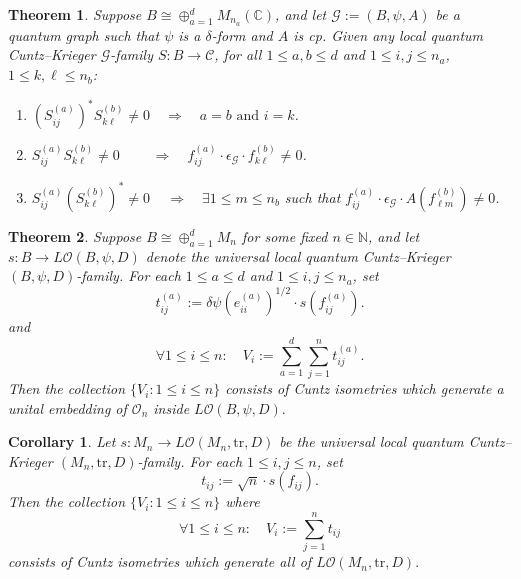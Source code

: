 \documentclass[10pt,a4paper]{amsart}
\newtheorem{theorem}{Theorem}
\newtheorem{corollary}{Corollary}
\newcommand\bC{{\mathbb C}}
\newcommand\cG{{\mathcal G}}
\newcommand\cO{{\mathcal O}}
\newcommand{\tr}{\text{tr}} %
\begin{document}
\begin{theorem}\label{thm:lqck_structure_theorem}
    Suppose $B\cong \oplus_{a=1}^d M_{n_a}(\bC)$, and let $\cG:=(B,\psi,A)$ be a quantum graph such that $\psi$ is a $\delta$-form and $A$ is cp. Given any local quantum Cuntz--Krieger $\cG$-family $S:B\to \mathcal{C}$, for all $1\leq a,b\leq d$ and $1\leq i,j\leq n_a$, $1\leq k,\ell\leq n_b$: 
    \begin{enumerate}
        \item $(S^{(a)}_{ij})^* S^{(b)}_{k\ell} \neq 0 
        \quad \Longrightarrow \quad 
        a=b\text{ and }i=k$.
        \item $S^{(a)}_{ij} S^{(b)}_{k\ell} \neq 0 
        \quad \quad \; \Longrightarrow \quad
        f_{ij}^{(a)}\cdot \epsilon_\cG\cdot f_{k\ell}^{(b)}\neq 0$.
        \item $S^{(a)}_{ij} (S^{(b)}_{k\ell})^* \neq 0 
        \quad \,\Longrightarrow \quad
        \exists 1\leq m\leq n_b$ such that $f_{ij}^{(a)}\cdot \epsilon_\cG\cdot A(f_{\ell m}^{(b)}) \neq 0$. 
    \end{enumerate}
\end{theorem}

\begin{theorem}\label{thm:unital_embedding_of_O_n}
     Suppose $B\cong \oplus_{a=1}^d M_n$ for some fixed $n\in \mathbb{N}$, and let $s:B\to L\cO(B,\psi,D)$ denote the universal local quantum Cuntz--Krieger $(B,\psi,D)$-family. For each $1\leq a\leq d$ and $1\leq i,j \leq n_a$, set 
     \[
     t^{(a)}_{ij}
     :=
     \delta\psi(e_{ii}^{(a)})^{1/2}\cdot s(f_{ij}^{(a)}).
     \] 
     and 
      \[
     \forall 1\leq i\leq n: \quad
     V_i
     :=\sum_{a=1}^d\sum_{j=1}^n t^{(a)}_{ij}.
     \] 
     Then the collection $\{V_i:1\leq i\leq n\}$ 
    consists of Cuntz isometries which generate a unital embedding of $\cO_n$ inside $L\cO(B,\psi,D).$
\end{theorem}

\begin{corollary}\label{cor:cuntz_isometries_for_L(M_n-tr-D}
    Let $s:M_n\to L\cO(M_n,\tr,D)$ be the universal local quantum Cuntz--Krieger $(M_n,\tr,D)$-family. For each $1\leq i,j \leq n$, set \[t_{ij}:=\sqrt{n}\cdot s(f_{ij}).\] Then the collection $\{V_i:1\leq i\leq n\}$ where 
     \[
     \forall 1\leq i\leq n: \quad
     V_i
     :=\sum_{j=1}^n t_{ij}
     \] consists of Cuntz isometries which generate all of $L\cO(M_n,\tr,D).$
\end{corollary}
\end{document}
